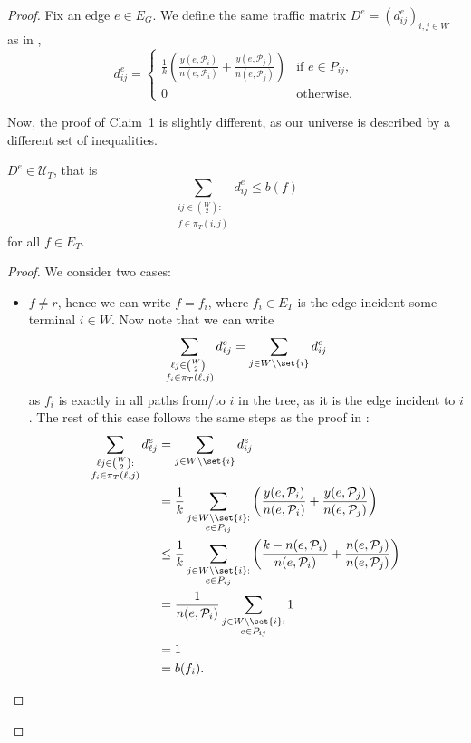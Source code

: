 \begin{proof}
    Fix an edge $e \in E_G$.
    We define the same traffic matrix $D^e = (d^e_{ij})_{i,j \in W}$ as in \cite{grandoni2008short},
    \[
        d^e_{ij} = \begin{cases}
                       \frac 1 k \left( \frac{y(e, \mathcal P_i)}{n(e, \mathcal P_i)} + \frac{y(e, \mathcal P_j)}{n(e, \mathcal P_j)} \right) & \text{if $e \in P_{ij}$,} \\
                       0 & \text{otherwise.}
        \end{cases}
    \]

    Now, the proof of Claim~1 is slightly different, as our universe is described by a different set of inequalities.

    \renewcommand\theclaim{1}
    \begin{claim}
        $D^e \in \mathcal U_T$, that is
        \[
            \sum_{\substack{ij \in \binom{W}{2}:\\f \in \pi_T(i,j)}} d^e_{ij} \le b(f)
        \]
        for all $f \in E_T$.
    \end{claim}
    \begin{proof}
        We consider two cases:
        \begin{itemize}
            \item $f \neq r$, hence we can write $f = f_i$, where $f_i \in E_T$ is the edge incident some terminal $i \in W$.
            Now note that we can write
            \[
                \sum_{\substack{\ell j \in \binom{W}{2}:\\f_i \in \pi_T(\ell,j)}} d^e_{\ell j} = \sum_{j \in W \setminus \set{i}} d^e_{ij}
            \]
            as $f_i$ is exactly in all paths from/to $i$ in the tree, as it is the edge incident to $i$.
            The rest of this case follows the same steps as the proof in \cite{grandoni2008short}:
            \[
                \begin{split}
                    \sum_{\substack{\ell j \in \binom{W}{2}:\\f_i \in \pi_T(\ell,j)}} d^e_{\ell j} &= \sum_{j \in W \setminus \set{i}} d^e_{ij} \\
                    &= \frac 1 k \sum_{\substack{j \in W \setminus \set{i}:\\ e \in P_{ij}}} \left( \frac{y(e, \mathcal P_i)}{n(e, \mathcal P_i)} + \frac{y(e, \mathcal P_j)}{n(e, \mathcal P_j)} \right) \\
                    &\le \frac 1 k \sum_{\substack{j \in W \setminus \set{i}:\\ e \in P_{ij}}} \left( \frac{k - n(e, \mathcal P_i)}{n(e, \mathcal P_i)} + \frac{n(e, \mathcal P_j)}{n(e, \mathcal P_j)} \right) \\
                    &= \frac{1}{n(e, \mathcal P_i)} \sum_{\substack{j \in W \setminus \set{i}:\\ e \in P_{ij}}} 1 \\
                    &= 1 \\
                    &= b(f_i).
                \end{split}
            \]


\end{itemize}
\end{proof}
\end{proof}
